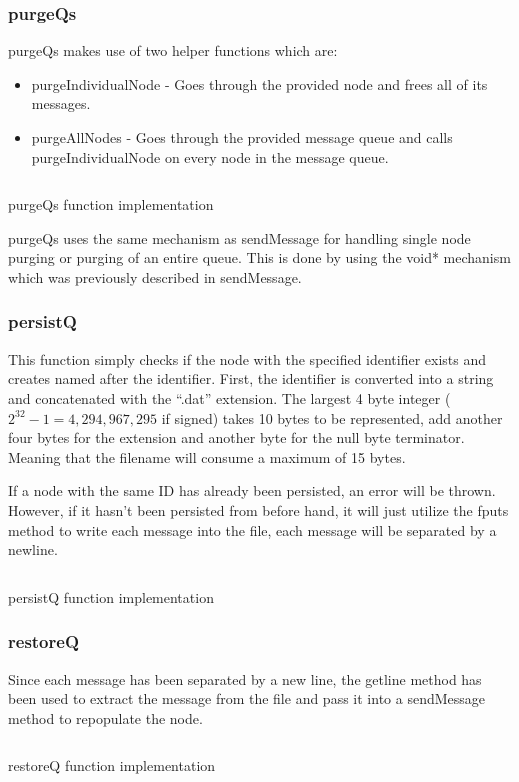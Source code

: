 \documentclass[a4paper, 12pt, titlepage]{article}
\newenvironment{code}{\captionsetup{type=listing}}{}
\newcommand{\sourcecode}[3]{
    \begin{code}
      \inputminted[linenos,numbersep=5pt,gobble=0,frame=lines,framesep=2mm,]{c}{#1}
        \caption{#2}
        \label{lst: #3}
    \end{code}
}
\begin{document}
\begin{onehalfspacing}
  \subsubsection{purgeQs}
  purgeQs makes use of two helper functions which are:
  \begin{itemize}
  \item purgeIndividualNode - Goes through the provided node and frees all of its messages.
  \item purgeAllNodes - Goes through the provided message queue and calls purgeIndividualNode on every node in the message queue.
  \end{itemize}

  \sourcecode{snippets/purgeQs.c}{purgeQs function implementation}{purgeQs}

  purgeQs uses the same mechanism as sendMessage for handling single node purging or purging of an entire queue. This is done by using the void* mechanism which was previously described in sendMessage.



  \subsubsection{persistQ}
  This function simply checks if the node with the specified identifier exists and creates named after the identifier. First, the identifier is converted into a string and concatenated with the ``.dat'' extension. The largest 4 byte integer ($2^{32} - 1 = 4,294,967,295$ if signed) takes 10 bytes to be represented, add another four bytes for the extension and another byte for the null byte terminator. Meaning that the filename will consume a maximum of  15 bytes.

  If a node with the same ID has already been persisted, an error will be thrown. However, if it hasn't been persisted from before hand, it will just utilize the fputs method to write each message into the file, each message will be separated by a newline.

  \sourcecode{snippets/persistQ.c}{persistQ function implementation}{persistQ}
  \subsubsection{restoreQ}
  Since each message has been separated by a new line, the getline method has been used to extract the message from the file and pass it into a sendMessage method to repopulate the node.

  \sourcecode{snippets/restoreQ.c}{restoreQ function implementation}{restoreQ}


\end{onehalfspacing}
\end{document}
